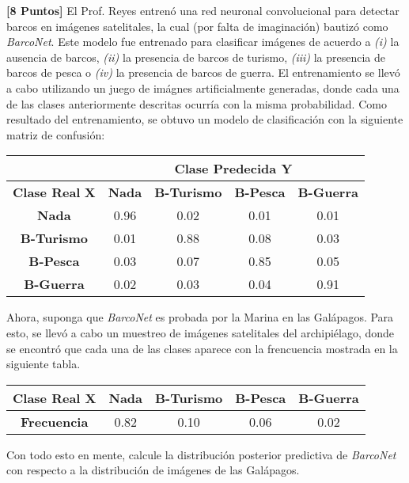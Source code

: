 \documentclass[ a4paper, twoside, 11pt]{article}
\begin{document}
\begin{problem}
\textbf{[8 Puntos]} El Prof. Reyes entren\'o una red neuronal convolucional para detectar barcos en im\'agenes satelitales, la cual (por falta de imaginaci\'on) bautiz\'o como \emph{BarcoNet}. Este modelo fue entrenado para clasificar im\'agenes de acuerdo a \textit{(i)} la ausencia de barcos, \textit{(ii)} la presencia de barcos de turismo, \textit{(iii)} la presencia de barcos de pesca o \textit{(iv)} la presencia de barcos de guerra. El entrenamiento se llev\'o a cabo utilizando un juego de im\'agnes artificialmente generadas, donde cada una de las clases anteriormente descritas ocurr\'ia con la misma probabilidad. Como resultado del entrenamiento, se obtuvo un modelo de clasificaci\'on con la siguiente matriz de confusi\'on: 
\begin{table}[htb]
\centering
\begin{tabular}{c|c|c|c|c|}
\cline{2-5}
 & \multicolumn{4}{c|}{\textbf{Clase Predecida} $\boldsymbol{Y}$} \\ \hline
\multicolumn{1}{|c|}{\textbf{Clase Real} $\boldsymbol{X}$} & \textbf{Nada} & \textbf{B-Turismo} & \textbf{B-Pesca} & \textbf{B-Guerra} \\ \hline
\multicolumn{1}{|c|}{\textbf{Nada}} & 0.96 & 0.02 & 0.01 & 0.01 \\ \hline
\multicolumn{1}{|c|}{\textbf{B-Turismo}} & 0.01 & 0.88 & 0.08 & 0.03 \\ \hline
\multicolumn{1}{|c|}{\textbf{B-Pesca}} & 0.03 & 0.07 & 0.85 & 0.05 \\ \hline
\multicolumn{1}{|c|}{\textbf{B-Guerra}} & 0.02 & 0.03 & 0.04 & 0.91 \\ \hline
\end{tabular}
\end{table}

Ahora, suponga que \emph{BarcoNet} es probada por la Marina en las Gal\'apagos. Para esto, se llev\'o a cabo un muestreo de im\'agenes satelitales del archipi\'elago, donde se encontr\'o que cada una de las clases aparece con la frencuencia mostrada en la siguiente tabla. 

\begin{table}[htb]
\centering
\begin{tabular}{|c|c|c|c|c|}
\hline
\textbf{Clase Real $\boldsymbol{X}$} & \textbf{Nada} & \textbf{B-Turismo} & \textbf{B-Pesca} & \textbf{B-Guerra} \\ \hline
\textbf{Frecuencia} & 0.82 & 0.10 & 0.06 & 0.02 \\ \hline
\end{tabular}
\end{table}

Con todo esto en mente, calcule la distribuci\'on posterior predictiva de \emph{BarcoNet} con respecto a la distribuci\'on de im\'agenes de las Gal\'apagos. 

\end{problem}
\fullskip
\end{document}
